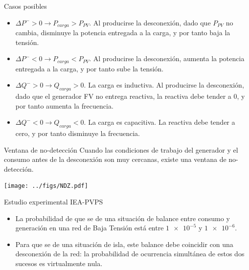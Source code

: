 \documentclass[xcolor={usenames,svgnames,dvipsnames}]{beamer}
\begin{document}
\begin{frame}[label={sec:org8a05dea}]{Casos posibles}
\begin{itemize}
\item \(\Delta P^{-}>0\rightarrow P_{carga}>P_{PV}\). Al producirse la
desconexión, dado que \(P_{PV}\) no cambia, disminuye la potencia
entregada a la carga, y por tanto baja la tensión.

\item \(\Delta P^{-}<0\rightarrow P_{carga}<P_{PV}\). Al producirse la
desconexión, aumenta la potencia entregada a la carga, y por tanto
sube la tensión.

\item \(\Delta Q^{-}>0\rightarrow Q_{carga}>0\). La carga es inductiva. Al
producirse la desconexión, dado que el generador FV no entrega
reactiva, la reactiva debe tender a 0, y por tanto aumenta la
frecuencia.

\item \(\Delta Q^{-}<0\rightarrow Q_{carga}<0\). La carga es capacitiva. La
reactiva debe tender a cero, y por tanto disminuye la frecuencia.
\end{itemize}
\end{frame}

\begin{frame}[label={sec:org2738492}]{Ventana de no-detección}
Cuando las condiciones de trabajo del generador y el consumo antes de la
desconexión son muy cercanas, existe una ventana de no-detección.

\begin{center}
\begin{center}
\texttt{[image: ../figs/NDZ.pdf]}
\end{center}
\end{center}
\end{frame}

\begin{frame}[label={sec:orgae0fd0c}]{Estudio experimental IEA-PVPS}
\begin{itemize}
\item La probabilidad de que se de una situación de balance entre consumo y
generación en una red de Baja Tensión está entre \(\num{1e-5}\) y
\(\num{1e-6}\).

\item Para que se de una situación de isla, este balance debe coincidir con
una desconexión de la red: la probabilidad de ocurrencia simultánea
de estos dos sucesos es virtualmente nula.
\end{itemize}
\end{frame}
\end{document}
